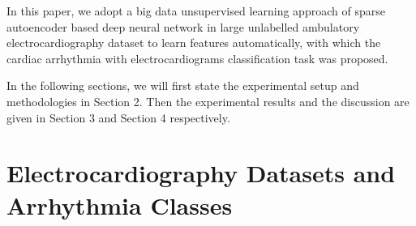\documentclass[journal]{IEEEtran}
\begin{document}
In this paper, we adopt a big data unsupervised learning approach of sparse autoencoder based deep neural network in large unlabelled ambulatory electrocardiography dataset to learn features automatically, with which the cardiac arrhythmia with electrocardiograms classification task was proposed. 

In the following sections, we will first state the experimental setup and methodologies in Section 2. Then the experimental results and the discussion are given in Section 3 and Section 4 respectively.

\section{Electrocardiography Datasets and Arrhythmia Classes}
\end{document}
